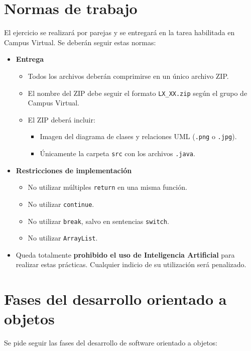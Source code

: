 \documentclass[11pt,a4paper]{article}
\begin{document}
\section{Normas de trabajo}

El ejercicio se realizará por parejas y se entregará en la tarea habilitada en Campus Virtual. Se deberán seguir estas normas:

\begin{itemize}
    \item \textbf{Entrega}
    \begin{itemize}
        \item Todos los archivos deberán comprimirse en un único archivo ZIP.
        \item El nombre del ZIP debe seguir el formato \texttt{LX\_XX.zip} según el grupo de Campus Virtual.
        \item El ZIP deberá incluir:
        \begin{itemize}
            \item Imagen del diagrama de clases y relaciones UML (\texttt{.png} o \texttt{.jpg}).
            \item Únicamente la carpeta \texttt{src} con los archivos \texttt{.java}.
        \end{itemize}
    \end{itemize}
    \item \textbf{Restricciones de implementación}
    \begin{itemize}
        \item No utilizar múltiples \texttt{return} en una misma función.
        \item No utilizar \texttt{continue}.
        \item No utilizar \texttt{break}, salvo en sentencias \texttt{switch}.
        \item No utilizar \texttt{ArrayList}.
    \end{itemize}
    \item Queda totalmente \textbf{prohibido el uso de Inteligencia Artificial} para realizar estas prácticas. Cualquier indicio de su utilización será penalizado.
\end{itemize}

\clearpage
\section{Fases del desarrollo orientado a objetos}

Se pide seguir las fases del desarrollo de software orientado a objetos:
\end{document}
